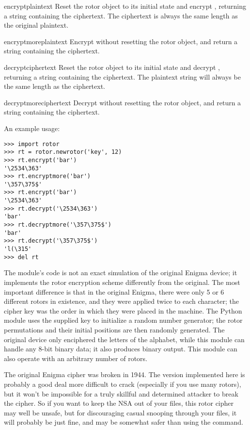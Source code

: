 \begin{methoddesc}[rotor]{encrypt}{plaintext}
Reset the rotor object to its initial state and encrypt ,
returning a string containing the ciphertext.  The ciphertext is always the
same length as the original plaintext.
\end{methoddesc}

\begin{methoddesc}[rotor]{encryptmore}{plaintext}
Encrypt  without resetting the rotor object, and return a
string containing the ciphertext.
\end{methoddesc}

\begin{methoddesc}[rotor]{decrypt}{ciphertext}
Reset the rotor object to its initial state and decrypt ,
returning a string containing the ciphertext.  The plaintext string will
always be the same length as the ciphertext.
\end{methoddesc}

\begin{methoddesc}[rotor]{decryptmore}{ciphertext}
Decrypt  without resetting the rotor object, and return a
string containing the ciphertext.
\end{methoddesc}

An example usage:
\begin{verbatim}
>>> import rotor
>>> rt = rotor.newrotor('key', 12)
>>> rt.encrypt('bar')
'\2534\363'
>>> rt.encryptmore('bar')
'\357\375$'
>>> rt.encrypt('bar')
'\2534\363'
>>> rt.decrypt('\2534\363')
'bar'
>>> rt.decryptmore('\357\375$')
'bar'
>>> rt.decrypt('\357\375$')
'l(\315'
>>> del rt
\end{verbatim}

The module's code is not an exact simulation of the original Enigma
device; it implements the rotor encryption scheme differently from the
original. The most important difference is that in the original
Enigma, there were only 5 or 6 different rotors in existence, and they
were applied twice to each character; the cipher key was the order in
which they were placed in the machine.  The Python 
module uses the supplied key to initialize a random number generator;
the rotor permutations and their initial positions are then randomly
generated.  The original device only enciphered the letters of the
alphabet, while this module can handle any 8-bit binary data; it also
produces binary output.  This module can also operate with an
arbitrary number of rotors.

The original Enigma cipher was broken in 1944. %
The version implemented here is probably a good deal more difficult to crack
(especially if you use many rotors), but it won't be impossible for
a truly skillful and determined attacker to break the cipher.  So if you want
to keep the NSA out of your files, this rotor cipher may well be unsafe, but
for discouraging casual snooping through your files, it will probably be
just fine, and may be somewhat safer than using the \UNIX{} 
command.
